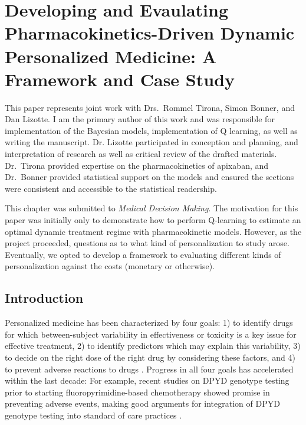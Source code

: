 \chapter[Developing and Evaluating PK-Driven Dynamic Personalized Medicine]{Developing and Evaulating Pharmacokinetics-Driven Dynamic Personalized Medicine: A Framework and Case Study}

This paper represents joint work with Drs.\ Rommel Tirona, Simon Bonner, and Dan Lizotte.   I am the primary author of this work and was responsible for implementation of the Bayesian models, implementation of Q learning, as well as writing the manuscript.  Dr. Lizotte participated in conception and planning, and interpretation of research as well as critical review of the drafted materials.  Dr.\ Tirona provided expertise on the pharmacokinetics of apixaban, and Dr.\ Bonner provided statistical support on the models and ensured the sections were consistent and accessible to the statistical readership.  

This chapter was submitted to \textit{Medical Decision Making}.  The motivation for this paper was initially only to demonstrate how to perform Q-learning to estimate an optimal dynamic treatment regime with pharmacokinetic models.  However, as the project proceeded, questions as to what kind of personalization to study arose.  Eventually, we opted to develop a framework to evaluating different kinds of personalization against the costs (monetary or otherwise).

\section{Introduction}

Personalized medicine has been characterized by four goals: 1) to identify drugs for which between-subject variability in effectiveness or toxicity is a key issue for effective treatment, 2) to identify predictors which may explain this variability, 3) to decide on the right dose of the right drug by considering these factors, and 4) to prevent adverse reactions to drugs \cite{morse2015personalized}.  Progress in all four goals has accelerated within the last decade: For example, recent studies on DPYD genotype testing prior to starting fluoropyrimidine-based chemotherapy showed promise in preventing adverse events, making good arguments for integration of DPYD genotype testing into standard of care practices \cite{wigle2019prospective}.  

